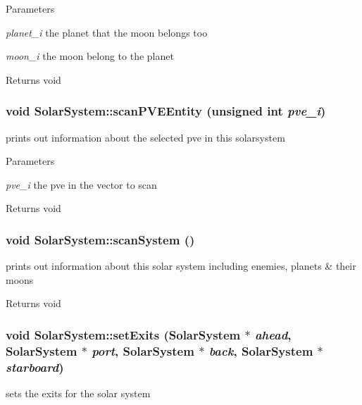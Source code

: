 \begin{DoxyParams}{Parameters}
\item[{\em planet\_\-i}]the planet that the moon belongs too \item[{\em moon\_\-i}]the moon belong to the planet\end{DoxyParams}
\begin{DoxyReturn}{Returns}
void 
\end{DoxyReturn}
\hypertarget{classSolarSystem_a92596df0b4af0f979c06f3de7685a74c}{
\subsubsection[{scanPVEEntity}]{\setlength{\rightskip}{0pt plus 5cm}void SolarSystem::scanPVEEntity (unsigned int {\em pve\_\-i})}}
\label{df/d5e/classSolarSystem_a92596df0b4af0f979c06f3de7685a74c}
prints out information about the selected pve in this solarsystem


\begin{DoxyParams}{Parameters}
\item[{\em pve\_\-i}]the pve in the vector to scan\end{DoxyParams}
\begin{DoxyReturn}{Returns}
void 
\end{DoxyReturn}
\hypertarget{classSolarSystem_a891417265b57aa785bd808fc7a2485c4}{
\subsubsection[{scanSystem}]{\setlength{\rightskip}{0pt plus 5cm}void SolarSystem::scanSystem ()}}
\label{df/d5e/classSolarSystem_a891417265b57aa785bd808fc7a2485c4}
prints out information about this solar system including enemies, planets \& their moons

\begin{DoxyReturn}{Returns}
void 
\end{DoxyReturn}
\hypertarget{classSolarSystem_a1d7fdbf5b11c2f4cd9b8151390e268a7}{
\subsubsection[{setExits}]{\setlength{\rightskip}{0pt plus 5cm}void SolarSystem::setExits ({\bf SolarSystem} $\ast$ {\em ahead}, \/  {\bf SolarSystem} $\ast$ {\em port}, \/  {\bf SolarSystem} $\ast$ {\em back}, \/  {\bf SolarSystem} $\ast$ {\em starboard})}}
\label{df/d5e/classSolarSystem_a1d7fdbf5b11c2f4cd9b8151390e268a7}
sets the exits for the solar system



